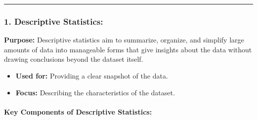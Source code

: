 \documentclass[12pt]{book}
\providecommand{\tightlist}{%
  \setlength{\itemsep}{0pt}\setlength{\parskip}{0pt}}
\begin{document}
\begin{center}\rule{0.5\linewidth}{0.5pt}\end{center}

\subsubsection{\texorpdfstring{\textbf{1. Descriptive
Statistics:}}{1. Descriptive Statistics:}}\label{descriptive-statistics}

\textbf{Purpose:} Descriptive statistics aim to summarize, organize, and
simplify large amounts of data into manageable forms that give insights
about the data without drawing conclusions beyond the dataset itself.

\begin{itemize}
\tightlist
\item
  \textbf{Used for:} Providing a clear snapshot of the data.
\item
  \textbf{Focus:} Describing the characteristics of the dataset.
\end{itemize}

\paragraph{\texorpdfstring{\textbf{Key Components of Descriptive
Statistics:}}{Key Components of Descriptive Statistics:}}\label{key-components-of-descriptive-statistics}
\end{document}
